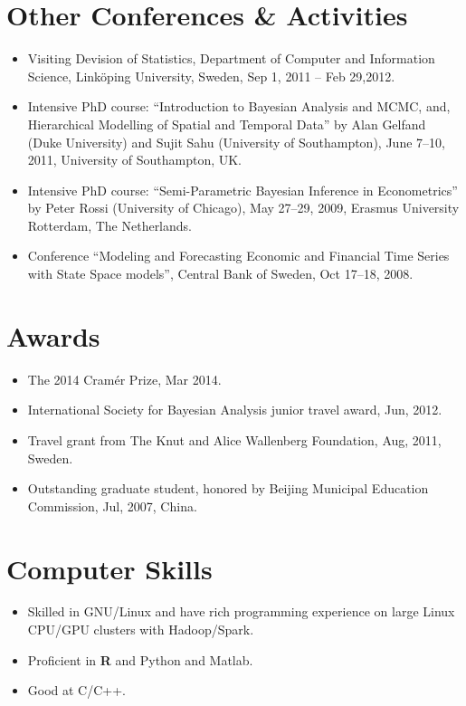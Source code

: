 \documentclass[twoside,a4paper]{article}
\begin{document}
\section{Other Conferences \& Activities}
\begin{itemize}
\item Visiting Devision of Statistics, Department of Computer and Information Science, Linköping University, Sweden, Sep 1, 2011 -- Feb 29,2012.

\item Intensive PhD course: ``Introduction to Bayesian Analysis and MCMC, and, Hierarchical Modelling of Spatial and Temporal Data'' by Alan Gelfand (Duke University) and Sujit Sahu (University of Southampton), June 7--10, 2011, University of Southampton, UK.

\item Intensive PhD course: ``Semi-Parametric Bayesian Inference in Econometrics'' by Peter Rossi (University of Chicago), May 27--29, 2009, Erasmus University Rotterdam, The Netherlands.

\item Conference ``Modeling and Forecasting Economic and Financial Time Series with State Space models'', Central Bank of Sweden, Oct 17--18, 2008.
\end{itemize}

\section{Awards}
\begin{itemize}

\item The 2014 Cramér Prize, Mar 2014.

\item International Society for Bayesian Analysis junior travel award, Jun, 2012.

\item Travel grant from The Knut and Alice Wallenberg Foundation, Aug, 2011, Sweden.

\item Outstanding graduate student, honored by Beijing Municipal Education Commission, Jul, 2007, China.

\end{itemize}


\section{Computer Skills}
\begin{itemize}
\item Skilled in GNU/Linux and have rich programming experience on large Linux CPU/GPU clusters with Hadoop/Spark.
\item Proficient in \textbf{R} and Python and Matlab.
\item Good at C/C++.
\end{itemize}
\end{document}
